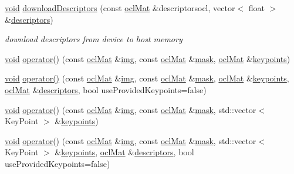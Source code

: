 \begin{DoxyCompactItemize}
\hyperlink{legacy_8hpp_a8bb47f092d473522721002c86c13b94e}{void} \hyperlink{classcv_1_1ocl_1_1SURF__OCL_a9c67f4b0a79b92082dd6a2b0fae117e6}{download\-Descriptors} (const \hyperlink{classcv_1_1ocl_1_1oclMat}{ocl\-Mat} \&descriptorsocl, vector$<$ float $>$ \&\hyperlink{compat_8hpp_a1e3702ddbca6258f57508c22eff26bf2}{descriptors})
\begin{DoxyCompactList}\small\item\em download descriptors from device to host memory \end{DoxyCompactList}\item 
\hyperlink{legacy_8hpp_a8bb47f092d473522721002c86c13b94e}{void} \hyperlink{classcv_1_1ocl_1_1SURF__OCL_a75a31edae91e28e7d74bbf2c9c01409e}{operator()} (const \hyperlink{classcv_1_1ocl_1_1oclMat}{ocl\-Mat} \&\hyperlink{legacy_8hpp_a5349238b3772bed6eae0fda3117ccfef}{img}, const \hyperlink{classcv_1_1ocl_1_1oclMat}{ocl\-Mat} \&\hyperlink{tracking_8hpp_a6b13ecd2fd6ec7ad422f1d7863c3ad19}{mask}, \hyperlink{classcv_1_1ocl_1_1oclMat}{ocl\-Mat} \&\hyperlink{compat_8hpp_af95b6678bbbdd664ed15fe6d4190d355}{keypoints})
\item 
\hyperlink{legacy_8hpp_a8bb47f092d473522721002c86c13b94e}{void} \hyperlink{classcv_1_1ocl_1_1SURF__OCL_a3474e6ab7a9a0ff1d30a9a06466681d9}{operator()} (const \hyperlink{classcv_1_1ocl_1_1oclMat}{ocl\-Mat} \&\hyperlink{legacy_8hpp_a5349238b3772bed6eae0fda3117ccfef}{img}, const \hyperlink{classcv_1_1ocl_1_1oclMat}{ocl\-Mat} \&\hyperlink{tracking_8hpp_a6b13ecd2fd6ec7ad422f1d7863c3ad19}{mask}, \hyperlink{classcv_1_1ocl_1_1oclMat}{ocl\-Mat} \&\hyperlink{compat_8hpp_af95b6678bbbdd664ed15fe6d4190d355}{keypoints}, \hyperlink{classcv_1_1ocl_1_1oclMat}{ocl\-Mat} \&\hyperlink{compat_8hpp_a1e3702ddbca6258f57508c22eff26bf2}{descriptors}, bool use\-Provided\-Keypoints=false)
\item 
\hyperlink{legacy_8hpp_a8bb47f092d473522721002c86c13b94e}{void} \hyperlink{classcv_1_1ocl_1_1SURF__OCL_a10d30cfb74c96dfb9ad9bef4dd969739}{operator()} (const \hyperlink{classcv_1_1ocl_1_1oclMat}{ocl\-Mat} \&\hyperlink{legacy_8hpp_a5349238b3772bed6eae0fda3117ccfef}{img}, const \hyperlink{classcv_1_1ocl_1_1oclMat}{ocl\-Mat} \&\hyperlink{tracking_8hpp_a6b13ecd2fd6ec7ad422f1d7863c3ad19}{mask}, std\-::vector$<$ Key\-Point $>$ \&\hyperlink{compat_8hpp_af95b6678bbbdd664ed15fe6d4190d355}{keypoints})
\item 
\hyperlink{legacy_8hpp_a8bb47f092d473522721002c86c13b94e}{void} \hyperlink{classcv_1_1ocl_1_1SURF__OCL_aadfb80df324ebda488339187ae08ef0d}{operator()} (const \hyperlink{classcv_1_1ocl_1_1oclMat}{ocl\-Mat} \&\hyperlink{legacy_8hpp_a5349238b3772bed6eae0fda3117ccfef}{img}, const \hyperlink{classcv_1_1ocl_1_1oclMat}{ocl\-Mat} \&\hyperlink{tracking_8hpp_a6b13ecd2fd6ec7ad422f1d7863c3ad19}{mask}, std\-::vector$<$ Key\-Point $>$ \&\hyperlink{compat_8hpp_af95b6678bbbdd664ed15fe6d4190d355}{keypoints}, \hyperlink{classcv_1_1ocl_1_1oclMat}{ocl\-Mat} \&\hyperlink{compat_8hpp_a1e3702ddbca6258f57508c22eff26bf2}{descriptors}, bool use\-Provided\-Keypoints=false)

\end{DoxyCompactItemize}
